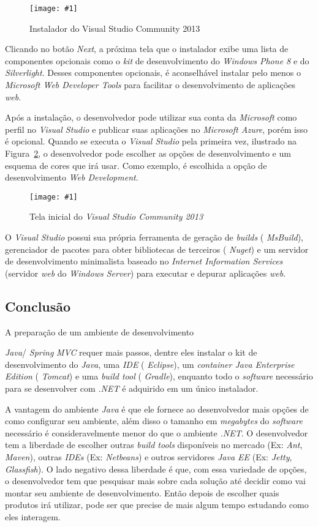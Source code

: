 \documentclass[a4paper,12pt]{article}
\newcommand{\spring} {
\lang{Java}/\est{Spring} \sigla{MVC}
}
\newcommand{\figura}[3] {
	\begin{figure}[ht]
		\centering
		\texttt{[image: \#1]}
		\caption{#2}
		\label{#3}
	\end{figure}
	\FloatBarrier
}
\newcommand{\est}[1] {
\textit{#1}}
\newcommand{\sigla}[1] {
\textit{#1}}
\newcommand{\lang}[1] {
\textit{#1}}
\begin{document}
\figura{vs1.png}{Instalador do Visual Studio Community 2013}{fig:vs1}

Clicando no botão \est{Next}, a próxima tela que o instalador exibe uma lista de componentes opcionais como o \est{kit} de desenvolvimento do \est{Windows Phone 8} e do \est{Silverlight}. Desses componentes opcionais, é aconselhável instalar pelo menos o \est{Microsoft Web Developer Tools} para facilitar o desenvolvimento de aplicações \est{web}.

Após a instalação, o desenvolvedor pode utilizar sua conta da \est{Microsoft} como perfil no \est{Visual Studio} e publicar suas aplicações no \est{Microsoft Azure}, porém isso é opcional. Quando se executa o \est{Visual Studio} pela primeira vez, ilustrado na Figura~\ref{fig:vs2}, o desenvolvedor pode escolher as opções de desenvolvimento e um esquema de cores que irá usar. Como exemplo, é escolhida a opção de desenvolvimento \est{Web Development}.

\figura{vs2.png}{Tela inicial do \est{Visual Studio Community 2013}}{fig:vs2}

O \est{Visual Studio} possui sua própria ferramenta de geração de \est{builds} (\est{MsBuild}), gerenciador de pacotes para obter bibliotecas de terceiros (\est{Nuget}) e um servidor de desenvolvimento minimalista baseado no \est{Internet Information Services} (servidor \est{web} do \est{Windows Server}) para executar e depurar aplicações \est{web}.  

\subsection{Conclusão}

A preparação de um ambiente de desenvolvimento \spring requer mais passos, dentre eles instalar o kit de desenvolvimento do \est{Java}, uma \sigla{IDE} (\est{Eclipse}), um \est{container Java Enterprise Edition} (\est{Tomcat}) e uma \est{build tool} (\est{Gradle}), enquanto  todo o \est{software} necessário para se desenvolver com \sigla{.NET} é adquirido em um único instalador.

A vantagem do ambiente \lang{Java} é que ele fornece ao desenvolvedor mais opções de como configurar seu ambiente, além disso o tamanho em \est{megabytes} do \est{software} necessário é consideravelmente menor do que o ambiente \sigla{.NET}. O desenvolvedor tem a liberdade de escolher outras \est{build tools} disponíveis no mercado (Ex: \est{Ant}, \est{Maven}), outras \sigla{IDEs} (Ex: \est{Netbeans}) e outros servidores \est{Java EE} (Ex: \est{Jetty}, \est{Glassfish}). O lado negativo dessa liberdade é que, com  essa variedade de opções, o desenvolvedor tem que pesquisar mais sobre cada solução até decidir como vai montar seu ambiente de desenvolvimento. Então depois de escolher quais produtos irá utilizar, pode ser que precise de mais algum tempo estudando como eles interagem.
\end{document}
